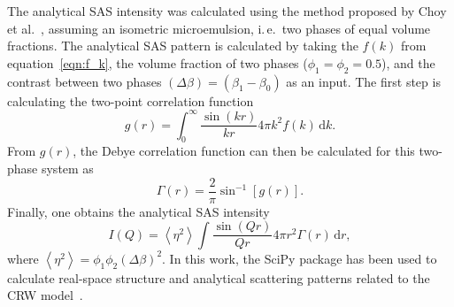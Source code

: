 \documentclass[preprint, 5p, times, twocolumn]{elsarticle}
\begin{document}
The analytical SAS intensity was calculated using the method proposed by Choy et al.~\cite{choy2000clipped}, assuming an isometric microemulsion, i.\,e.\ two phases of equal volume fractions. The analytical SAS pattern is calculated by taking the $f(k)$ from equation~\ref{eqn:f_k}, the volume fraction of two phases ($\phi_1=\phi_2=0.5$), and the contrast between two phases $ (\Delta \beta) = (\beta_1 - \beta_0)$ as an input. The first step is calculating the two-point correlation function
%
\begin{equation}
    g(r)=\int_0^{\infty} \frac{\sin(kr)}{kr} 4 \pi k^2 f(k) \,\mathrm{d}k.
\end{equation}
%
From $g(r)$, the Debye correlation function can then be calculated for this two-phase system as
%
\begin{equation}
    \Gamma(r)= \frac{2}{\pi} \sin^{-1} \left[ g(r) \right].
\end{equation}
%
Finally, one obtains the analytical SAS intensity
%
\begin{equation}
    I(Q)= \left\langle \eta^2 \right\rangle \int \frac{\sin(Qr)}{Qr} 4 \pi r^2 \Gamma(r) \,\mathrm{d}r,
\end{equation}
%
where $\left\langle \eta^2 \right\rangle=\phi_1 \phi_2 (\Delta \beta)^2$. In this work, the SciPy package has been used to calculate real-space structure and analytical scattering patterns related to the CRW model~\cite{2020SciPy-NMeth}. 

 

\end{document}
